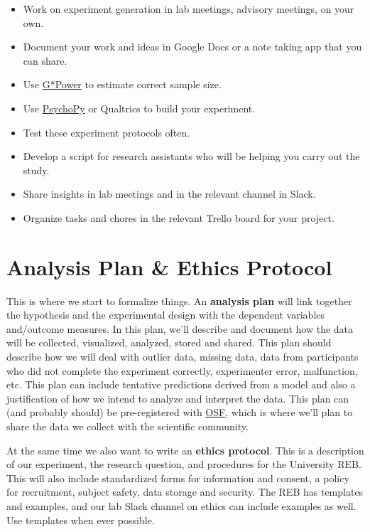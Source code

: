 \documentclass{article}
\begin{document}
\begin{itemize}
\item Work on experiment generation in lab meetings, advisory meetings, on your own.
\item Document your work and ideas in Google Docs or a note taking app that you can share. 
\item Use \href{http://www.gpower.hhu.de/en.html}{G*Power} to estimate correct sample size.
\item Use \href{https://www.psychopy.org/}{PsychoPy} or Qualtrics to build your experiment.
\item Test these experiment protocols often.
\item Develop a script for research assistants who will be helping you carry out the study.
\item Share insights in lab meetings and in the relevant channel in Slack.
\item Organize tasks and chores in the relevant Trello board for your project.
\end{itemize}


\section{Analysis Plan \& Ethics Protocol}
This is where we start to formalize things. An \textbf{analysis plan} will link together the hypothesis and the experimental design with the dependent variables and/outcome measures. In this plan, we'll describe and document how the data will be collected, visualized, analyzed, stored and shared. This plan should describe how we will deal with outlier data, missing data, data from participants who did not complete the experiment correctly, experimenter error, malfunction, etc. This plan can include tentative predictions derived from a model and also a justification of how we intend to analyze and interpret the data. This plan can (and probably should) be pre-registered with \href{https://osf.io/g9wxs/}{OSF}, which is where we'll plan to share the data we collect with the scientific community. 

At the same time we also want to write an \textbf{ethics protocol}. This is a description of our experiment, the research question, and procedures for the University REB. This will also include standardized forms for information and consent, a policy for recruitment, subject safety, data storage and security. The REB has templates and examples, and our lab Slack channel on ethics can include examples as well. Use templates when ever possible.
\end{document}
